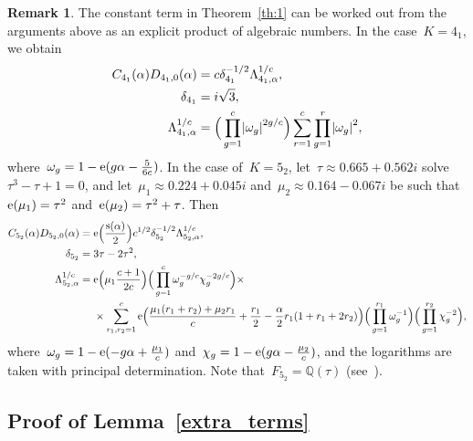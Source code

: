 \documentclass[11pt]{amsart}
\newcommand{\Q}{\mathbb{Q}}
\theoremstyle{definition}
\newtheorem{remark}{Remark}
\newcommand{\pr}[1]{\mathchoice{\left( #1\right)}{(#1)}{(#1)}{(#1)}}
\newcommand{\e}[1][]{\ifthenelse{\equal{#1}{}}{{\rm e}}{\operatorname{e}\pr{ #1}}}
\DeclareMathOperator{\deks}{s}
\newcommand{\1}{{\mathbf 1}}
\newcommand{\abs}[1]{\left|#1\right|}
\let\originalleft\left
\let\originalright\right
\renewcommand{\left}{\mathopen{}\mathclose\bgroup\originalleft}
\renewcommand{\right}{\aftergroup\egroup\originalright}
\numberwithin{equation}{section}
\begin{document}
\begin{remark}\label{c45}
The constant term in Theorem~\ref{th:1} can be worked out from the arguments above as an explicit product of algebraic numbers. In the case~$K = 4_1$, we obtain
\begin{align*}
  C_{4_1}(\alpha)D_{4_1,0}(\alpha) = {}&{} c \delta_{4_1}^{-1/2} \Lambda_{4_1, \alpha}^{1/c}, \\
  \delta_{4_1} = {}& i\sqrt{3}, \\
  \Lambda_{4_1,\alpha}^{1/c} = {}&{} \Big(\prod_{g=1}^c \abs{\omega_g}^{2g/c}\Big)\sum_{r=1}^c \prod_{g=1}^{r} \abs{\omega_g}^2,
\end{align*}
where~$\omega_g = 1-\e(g\alpha - \tfrac5{6c})$.
In the case of~$K = 5_2$, let~$\tau \approx 0.665 + 0.562i$ solve~$\tau^3-\tau+1 =0$, and let~$\mu_1 \approx 0.224 + 0.045i$ and~$\mu_2 \approx 0.164-0.067i$ be such that~$\e(\mu_1) = \tau^2$ and~$\e(\mu_2) = \tau^2+\tau$. Then
\begin{align*}
  C_{5_2}(\alpha)D_{5_2,0}(\alpha) = {}&{} \e\Big(\frac{\deks(\alpha)}2\Big) c^{1/2} \delta_{5_2}^{-1/2} \Lambda_{5_2, \alpha}^{1/c}, \\
  \delta_{5_2} = {}& 3\tau-2\tau^2, \\
  \Lambda_{5_2,\alpha}^{1/c} = {}&{} \e\Big(\mu_1\frac{c+1}{2c}\Big) \Big(\prod_{g=1}^c \omega_g^{-g/c}\chi_g^{-2g/c}\Big) \times \\
  &{} \times\sum_{r_1, r_2 =1}^c \e\Big(\frac{\mu_1(r_1+r_2) + \mu_2 r_1}c + \frac{r_1}2 - \frac{\alpha}2 r_1(1+r_1+2r_2)\Big) \Big(\prod_{g=1}^{r_1} \omega_g^{-1}\Big) \Big(\prod_{g=1}^{r_2} \chi_g^{-2}\Big),
\end{align*}
where~$\omega_g = 1-\e(-g\alpha + \tfrac{\mu_1}c)$ and~$\chi_g = 1-\e(g\alpha - \tfrac{\mu_2}c)$, and the logarithms are taken with principal determination. Note that~$F_{5_2} = \Q(\tau)$ (see~\cite{Ohtsuki52}). \end{remark}

\subsection{Proof of Lemma~\ref{extra_terms}}\label{prolex}
\end{document}

